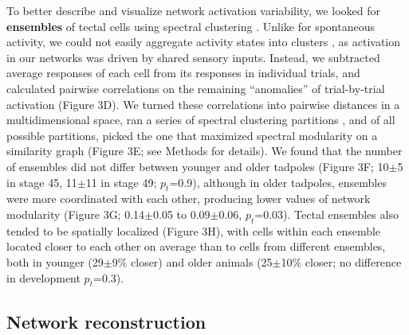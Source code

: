 \documentclass{article}
\begin{document}
To better describe and visualize network activation variability, we looked for \textbf{ensembles} of tectal cells using spectral clustering \citep{thompson2016ensembles}. Unlike for spontaneous activity, we could not easily aggregate activity states into clusters \citep{avitan2017spontaneous}, as activation in our networks was driven by shared sensory inputs. Instead, we subtracted average responses of each cell from its responses in individual trials, and calculated pairwise correlations on the remaining “anomalies” of trial-by-trial activation (Figure 3D). We turned these correlations into pairwise distances in a multidimensional space, ran a series of spectral clustering partitions \citep{ng2002spectral}, and of all possible partitions, picked the one that maximized spectral modularity on a similarity graph \citep{newman2006modularity, gomez2009community} (Figure 3E; see Methods for details). We found that the number of ensembles did not differ between younger and older tadpoles (Figure 3F; 10$\pm$5 in stage 45, 11$\pm$11 in stage 49; $p_t$=0.9), although in older tadpoles, ensembles were more coordinated with each other,  producing lower values of network modularity (Figure 3G; 0.14$\pm$0.05 to 0.09$\pm$0.06, $p_t$=0.03). Tectal ensembles also tended to be spatially localized (Figure 3H), with cells within each ensemble located closer to each other on average than to cells from different ensembles, both in younger (29$\pm$9\% closer) and older animals (25$\pm$10\% closer; no difference in development $p_t$=0.3).

\subsection*{Network reconstruction}
\end{document}
